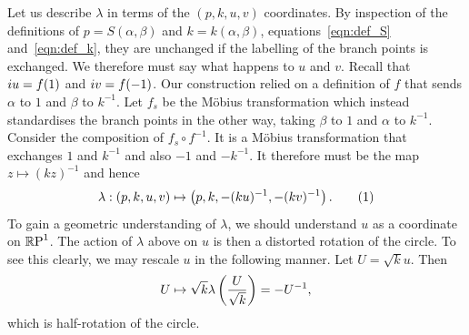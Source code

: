 \documentclass{article}
\begin{document}
Let us describe $\lambda$ in terms of the $(p,k,u,v)$ coordinates.
By inspection of the definitions of $p = S(\alpha,\beta)$ and $k = k(\alpha,\beta)$, equations~\eqref{eqn:def_S} and~\eqref{eqn:def_k}, they are unchanged if the labelling of the branch points is exchanged. We therefore must say what happens to $u$ and $v$. Recall that $i u = f(1)$ and $i v = f(-1)$. Our construction relied on a definition of $f$ that sends $\alpha$ to $1$ and $\beta$ to $k^{-1}$. Let $f_s$ be the M\"obius transformation which instead standardises the branch points in the other way, taking $\beta$ to $1$ and $\alpha$ to $k^{-1}$. Consider the composition of $f_s \circ f^{-1}$. It is a M\"obius transformation that exchanges $1$ and $k^{-1}$ and also $-1$ and $-k^{-1}$. It therefore must be the map $z \mapsto (kz)^{-1}$ and hence
\[
\lambda: (p,k,u,v) \mapsto \bra{ p,k, -(ku)^{-1}, -(kv)^{-1} }.
\labelthis{eqn:def_lambda}
\]
To gain a geometric understanding of $\lambda$, we should understand $u$ as a coordinate on $\mathbb{R}\text{P}^1$. The action of $\lambda$ above on $u$ is then a distorted rotation of the circle. To see this clearly, we may rescale $u$ in the following manner. Let $U=\sqrt{k} u$. Then
\[
U
\mapsto \sqrt{k} \lambda\left(\frac{U}{\sqrt{k}} \right)
= -U^{-1},
\]
which is half-rotation of the circle.

\end{document}

